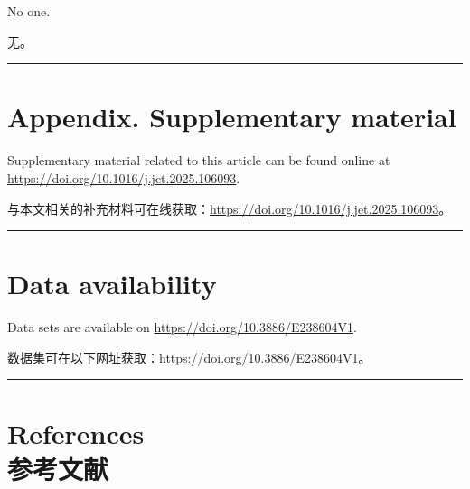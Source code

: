 \documentclass[12pt,a4paper]{article}
\newenvironment{original}
  {\par\vspace{0.5em}\noindent\color{black}\ignorespaces}
  {\par\vspace{0.3em}}
\newenvironment{translation}
  {\par\noindent\color{transblue}\ignorespaces}
  {\par\vspace{0.8em}\hrule\vspace{0.5em}}
\newcommand{\bilingualsection}[2]{%
  \section{\texorpdfstring{#1 \\[0.3em] {\large\color{transblue}#2}}{#1}}
}
\begin{document}
\begin{original}
No one.
\end{original}

\begin{translation}
无。
\end{translation}

\section*{Appendix. Supplementary material}

\begin{original}
Supplementary material related to this article can be found online at \url{https://doi.org/10.1016/j.jet.2025.106093}.
\end{original}

\begin{translation}
与本文相关的补充材料可在线获取：\url{https://doi.org/10.1016/j.jet.2025.106093}。
\end{translation}

\section*{Data availability}

\begin{original}
Data sets are available on \url{https://doi.org/10.3886/E238604V1}.
\end{original}

\begin{translation}
数据集可在以下网址获取：\url{https://doi.org/10.3886/E238604V1}。
\end{translation}

\bilingualsection{References}{参考文献}
\end{document}
